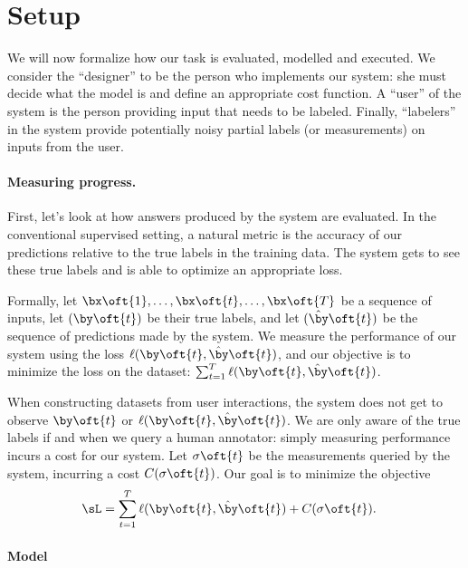 \section{Setup}
\label{sec:problem}

We will now formalize how our task is evaluated, modelled and executed. 
We consider the ``designer'' to be the person who implements our system: she must decide what the model is and define an appropriate cost function.
A ``user'' of the system is the person providing input that needs to be labeled. 
Finally, ``labelers'' in the system provide potentially noisy partial labels (or measurements) on inputs from the user. 

\paragraph{Measuring progress.}

First, let's look at how answers produced by the system are evaluated.
In the conventional supervised setting, a natural metric is the accuracy of our predictions relative to the true labels in the training data.
The system gets to see these true labels and is able to optimize an appropriate loss.

Formally, let $\bx\oft{1}, \dots, \bx\oft{t}, \dots, \bx\oft{T}$ be a sequence of inputs, 
let $(\by\oft{t})$ be their true labels,
and let $(\byt\oft{t})$ be the sequence of predictions made by the system.
We measure the performance of our system using the loss $\ell(\by\oft{t}, \byt\oft{t})$, and our objective is to minimize the loss on the dataset: $\sum_{t=1}^T \ell(\by\oft{t}, \byt\oft{t})$.

When constructing datasets from user interactions, the system does not get to observe $\by\oft{t}$ or $\ell(\by\oft{t}, \byt\oft{t})$.
We are only aware of the true labels if and when we query a human annotator: simply measuring performance incurs a cost for our system.
Let $\sigma\oft{t}$ be the measurements queried by the system, incurring a cost $C(\sigma\oft{t})$.
Our goal is to minimize the objective
\begin{align*}
  \sL &= \sum_{t=1}^T \ell(\by\oft{t}, \byt\oft{t}) + C(\sigma\oft{t}).
\end{align*}

\paragraph{Model}


